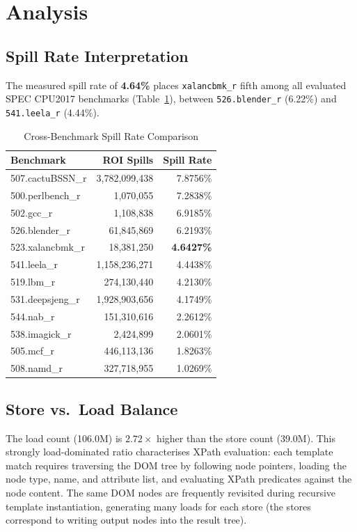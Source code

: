 \documentclass[conference]{IEEEtran}
\begin{document}
\section{Analysis}

\subsection{Spill Rate Interpretation}

The measured spill rate of \textbf{4.64\%} places \texttt{xalancbmk\_r}
fifth among all evaluated SPEC CPU2017 benchmarks
(Table~\ref{tab:compare}), between \texttt{526.blender\_r} (6.22\%)
and \texttt{541.leela\_r} (4.44\%).

\begin{table}[H]
\centering
\caption{Cross-Benchmark Spill Rate Comparison}
\label{tab:compare}
\begin{tabular}{lrr}
\toprule
\textbf{Benchmark} & \textbf{ROI Spills} & \textbf{Spill Rate} \\
\midrule
507.cactuBSSN\_r & 3,782,099,438 & 7.8756\% \\
500.perlbench\_r &     1,070,055 & 7.2838\% \\
502.gcc\_r       &     1,108,838 & 6.9185\% \\
526.blender\_r   &    61,845,869 & 6.2193\% \\
523.xalancbmk\_r &    18,381,250 & \textbf{4.6427\%} \\
541.leela\_r     & 1,158,236,271 & 4.4438\% \\
519.lbm\_r       &   274,130,440 & 4.2130\% \\
531.deepsjeng\_r & 1,928,903,656 & 4.1749\% \\
544.nab\_r       &   151,310,616 & 2.2612\% \\
538.imagick\_r   &     2,424,899 & 2.0601\% \\
505.mcf\_r       &   446,113,136 & 1.8263\% \\
508.namd\_r      &   327,718,955 & 1.0269\% \\
\bottomrule
\end{tabular}
\end{table}

\subsection{Store vs.\ Load Balance}

The load count (106.0M) is $2.72\times$ higher than the store count
(39.0M). This strongly load-dominated ratio characterises XPath
evaluation: each template match requires traversing the DOM tree by
following node pointers, loading the node type, name, and attribute
list, and evaluating XPath predicates against the node content.
The same DOM nodes are frequently revisited during recursive template
instantiation, generating many loads for each store (the stores
correspond to writing output nodes into the result tree).
\end{document}
